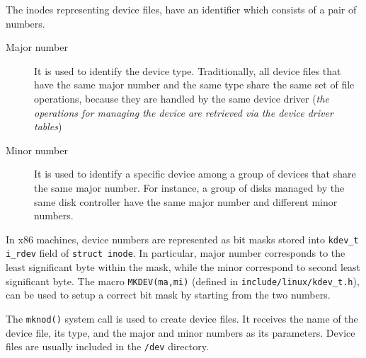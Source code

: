 \documentclass[10pt,a4paper]{article}
\begin{document}
The inodes representing device files, have an identifier which consists of a pair of numbers. 

\begin{description}

\item[Major number] It is used to identify the device type. Traditionally, all device files that have the same major number and the same type share the same set of file operations, because they are handled by the same device driver (\textit{the operations for managing the device are retrieved via the device driver tables})
\item[Minor number] It is used to identify a specific device among a group of devices that share the same major number. For instance, a group of disks managed by the same disk controller have the same major number and different minor numbers.
\end{description}

In x86 machines, device numbers are represented as bit masks stored into \texttt{kdev\_t i\_rdev} field of \texttt{struct inode}. In particular, major number corresponds to the least significant byte within the mask, while the minor correspond to second least significant byte. The macro \texttt{MKDEV(ma,mi)} (defined in \texttt{include/linux/kdev\_t.h}), can be used to setup a correct bit mask by starting from the two numbers.




The \texttt{mknod()} system call is used to create device files. It receives the name of the device file, its type, and the major and minor numbers as its parameters. Device files are usually included in the \texttt{/dev} directory.
\end{document}
